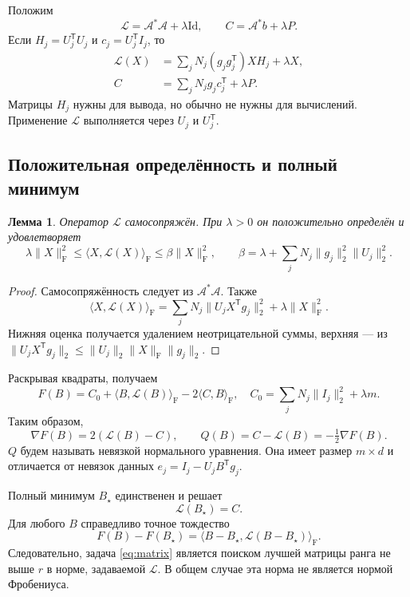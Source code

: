\documentclass[11pt,a4paper]{article}
\numberwithin{equation}{section}
\newtheorem{lemma}[theorem]{Лемма}
\theoremstyle{remark}
\newcommand{\Id}{\mathrm{Id}}
\newcommand{\T}{^{\mathsf T}}
\newcommand{\F}{_{\mathrm F}}
\newcommand{\ip}[2]{\langle #1,#2\rangle_{\mathrm F}}
\begin{document}
Положим
\begin{equation}\label{eq:LC}
 \mathcal L=\mathcal A^*\mathcal A+\lambda\Id,
 \qquad C=\mathcal A^*b+\lambda P.
\end{equation}
Если $H_j=U_j\T U_j$ и $c_j=U_j\T I_j$, то
\begin{align}
 \mathcal L(X)&=\sum_jN_j(g_jg_j\T)XH_j+\lambda X,\label{eq:L}\\
 C&=\sum_jN_jg_jc_j\T+\lambda P.\label{eq:C}
\end{align}
Матрицы $H_j$ нужны для вывода, но обычно не нужны для вычислений.
Применение $\mathcal L$ выполняется через $U_j$ и $U_j\T$.

\subsection{Положительная определённость и полный минимум}
\begin{lemma}\label{lem:spd}
Оператор $\mathcal L$ самосопряжён. При $\lambda>0$ он положительно
определён и удовлетворяет
\begin{equation}\label{eq:bounds}
 \lambda\|X\|\F^2\le\ip{X}{\mathcal L(X)}
 \le\beta\|X\|\F^2,
 \qquad
 \beta=\lambda+\sum_jN_j\|g_j\|_2^2\|U_j\|_2^2.
\end{equation}
\end{lemma}
\begin{proof}
Самосопряжённость следует из $\mathcal A^*\mathcal A$.
Также
\[
 \ip{X}{\mathcal L(X)}
 =\sum_jN_j\|U_jX\T g_j\|_2^2+\lambda\|X\|\F^2.
\]
Нижняя оценка получается удалением неотрицательной суммы, верхняя ---
из $\|U_jX\T g_j\|_2\le\|U_j\|_2\|X\|\F\|g_j\|_2$.
\end{proof}

Раскрывая квадраты, получаем
\begin{equation}\label{eq:quadratic}
 F(B)=C_0+\ip{B}{\mathcal L(B)}-2\ip{C}{B},
 \quad C_0=\sum_jN_j\|I_j\|_2^2+\lambda m.
\end{equation}
Таким образом,
\begin{equation}\label{eq:Q}
 \nabla F(B)=2(\mathcal L(B)-C),
 \qquad Q(B)=C-\mathcal L(B)=-\tfrac12\nabla F(B).
\end{equation}
$Q$ будем называть невязкой нормального уравнения. Она имеет размер
$m\times d$ и отличается от невязок данных
$e_j=I_j-U_jB\T g_j$.

Полный минимум $B_\star$ единственен и решает
\begin{equation}\label{eq:normal}
 \mathcal L(B_\star)=C.
\end{equation}
Для любого $B$ справедливо точное тождество
\begin{equation}\label{eq:energy}
 F(B)-F(B_\star)=\ip{B-B_\star}{\mathcal L(B-B_\star)}.
\end{equation}
Следовательно, задача \eqref{eq:matrix} является поиском лучшей матрицы
ранга не выше $r$ в норме, задаваемой $\mathcal L$.
В общем случае эта норма не является нормой Фробениуса.
\end{document}
